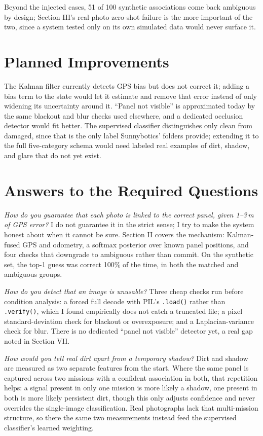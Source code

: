 \documentclass[10pt,conference]{IEEEtran}
\begin{document}
Beyond the injected cases, 51 of 100 synthetic associations come back ambiguous by design; Section III's real-photo zero-shot failure is the more important of the two, since a system tested only on its own simulated data would never surface it.

\section{Planned Improvements}
The Kalman filter currently detects GPS bias but does not correct it; adding a bias term to the state would let it estimate and remove that error instead of only widening its uncertainty around it. ``Panel not visible'' is approximated today by the same blackout and blur checks used elsewhere, and a dedicated occlusion detector would fit better. The supervised classifier distinguishes only clean from damaged, since that is the only label Sunnybotics' folders provide; extending it to the full five-category schema would need labeled real examples of dirt, shadow, and glare that do not yet exist.

\section{Answers to the Required Questions}

\textit{How do you guarantee that each photo is linked to the correct panel, given 1--3\,m of GPS error?} I do not guarantee it in the strict sense; I try to make the system honest about when it cannot be sure. Section II covers the mechanism: Kalman-fused GPS and odometry, a softmax posterior over known panel positions, and four checks that downgrade to ambiguous rather than commit. On the synthetic set, the top-1 guess was correct 100\% of the time, in both the matched and ambiguous groups.

\textit{How do you detect that an image is unusable?} Three cheap checks run before condition analysis: a forced full decode with PIL's \texttt{.load()} rather than \texttt{.verify()}, which I found empirically does not catch a truncated file; a pixel standard-deviation check for blackout or overexposure; and a Laplacian-variance check for blur. There is no dedicated ``panel not visible'' detector yet, a real gap noted in Section VII.

\textit{How would you tell real dirt apart from a temporary shadow?} Dirt and shadow are measured as two separate features from the start. Where the same panel is captured across two missions with a confident association in both, that repetition helps: a signal present in only one mission is more likely a shadow, one present in both is more likely persistent dirt, though this only adjusts confidence and never overrides the single-image classification. Real photographs lack that multi-mission structure, so there the same two measurements instead feed the supervised classifier's learned weighting.
\end{document}
